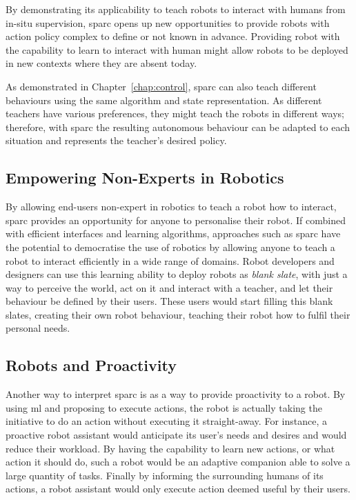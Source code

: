 By demonstrating its applicability to teach robots to interact with humans from in-situ supervision, \gls{sparc} opens up new opportunities to provide robots with action policy complex to define or not known in advance. Providing robot with the capability to learn to interact with human might allow robots to be deployed in new contexts where they are absent today.

As demonstrated in Chapter~\ref{chap:control}, \gls{sparc} can also teach different behaviours using the same algorithm and state representation. As different teachers have various preferences, they might teach the robots in different ways; therefore, with \gls{sparc} the resulting autonomous behaviour can be adapted to each situation and represents the teacher's desired policy. %

\subsection{Empowering Non-Experts in Robotics}

By allowing end-users non-expert in robotics to teach a robot how to interact, \gls{sparc} provides an opportunity for anyone to personalise their robot. If combined with efficient interfaces and learning algorithms, approaches such as \gls{sparc} have the potential to democratise the use of robotics by allowing anyone to teach a robot to interact efficiently in a wide range of domains. Robot developers and designers can use this learning ability to deploy robots as \emph{blank slate}, with just a way to perceive the world, act on it and interact with a teacher, and let their behaviour be defined by their users. These users would start filling this blank slates, creating their own robot behaviour, teaching their robot how to fulfil their personal needs.

\subsection{Robots and Proactivity}

Another way to interpret \gls{sparc} is as a way to provide proactivity to a robot. By using \gls{ml} and proposing to execute actions, the robot is actually taking the initiative to do an action without executing it straight-away. For instance, a proactive robot assistant would anticipate its user's needs and desires and would reduce their workload. By having the capability to learn new actions, or what action it should do, such a robot would be an adaptive companion able to solve a large quantity of tasks. Finally by informing the surrounding humans of its actions, a robot assistant would only execute action deemed useful by their users.

